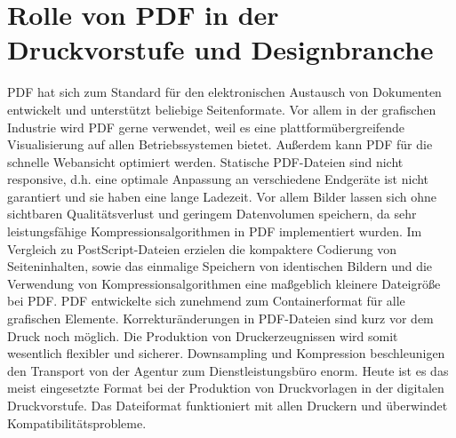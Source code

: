 \section{Rolle von PDF in der Druckvorstufe und Designbranche}
PDF hat sich zum Standard für den elektronischen Austausch von Dokumenten entwickelt und unterstützt beliebige Seitenformate. Vor allem in der grafischen Industrie wird PDF gerne verwendet, weil es eine plattformübergreifende Visualisierung auf allen Betriebssystemen bietet. Außerdem kann PDF für die schnelle Webansicht optimiert werden. Statische PDF-Dateien sind nicht responsive, d.h. eine optimale Anpassung an verschiedene Endgeräte ist nicht garantiert und sie haben eine lange Ladezeit. Vor allem Bilder lassen sich ohne sichtbaren Qualitätsverlust und geringem Datenvolumen speichern, da sehr leistungsfähige Kompressionsalgorithmen in PDF implementiert wurden. Im Vergleich zu PostScript-Dateien erzielen die kompaktere Codierung von Seiteninhalten, sowie das einmalige Speichern von identischen Bildern und die Verwendung von Kompressionsalgorithmen eine maßgeblich kleinere Dateigröße bei PDF. PDF entwickelte sich zunehmend zum Containerformat für alle grafischen Elemente. Korrekturänderungen in PDF-Dateien sind kurz vor dem Druck noch möglich. Die Produktion von Druckerzeugnissen wird somit wesentlich flexibler und sicherer. Downsampling und Kompression beschleunigen den Transport von der Agentur zum Dienstleistungsbüro enorm. Heute ist es das meist eingesetzte Format bei der Produktion von Druckvorlagen in der digitalen Druckvorstufe. Das Dateiformat funktioniert mit allen Druckern und überwindet Kompatibilitätsprobleme. \\
